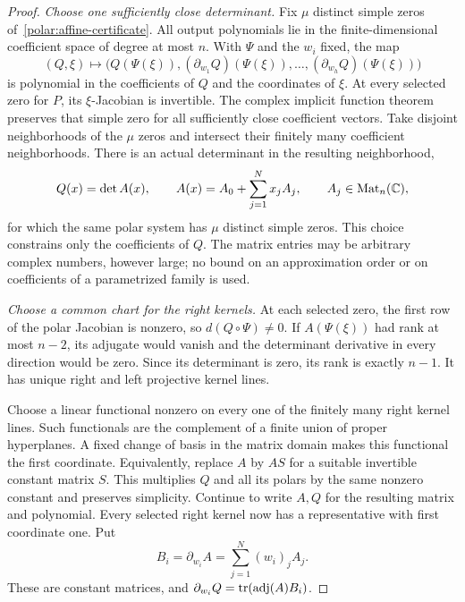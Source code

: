 \begin{proof}
\emph{Choose one sufficiently close determinant.}
Fix $\mu$ distinct simple zeros of~\eqref{polar:affine-certificate}.
All output polynomials lie in the finite-dimensional coefficient space
of degree at most $n$. With $\Psi$ and the $w_i$ fixed, the map
\[
 (Q,\xi)\longmapsto
   \bigl(Q(\Psi(\xi)),(\partial_{w_1}Q)(\Psi(\xi)),\ldots,
                         (\partial_{w_h}Q)(\Psi(\xi))\bigr)
\]
is polynomial in the coefficients of $Q$ and the coordinates of $\xi$.
At every selected zero for $P$, its $\xi$-Jacobian is invertible.
The complex implicit function theorem preserves that simple zero for all
sufficiently close coefficient vectors. Take disjoint neighborhoods of
the $\mu$ zeros and intersect their finitely many coefficient neighborhoods.
There is an actual determinant in the resulting neighborhood,
\begin{equation}\label{polar:chosen-matrix}
 Q(x)=\det A(x),\qquad
 A(x)=A_0+\sum_{j=1}^N x_jA_j,\qquad A_j\in\operatorname{Mat}_n(\mathbb C),
\end{equation}
for which the same polar system has $\mu$ distinct simple zeros.
This choice constrains only the coefficients of $Q$. The matrix entries
may be arbitrary complex numbers, however large; no bound on an
approximation order or on coefficients of a parametrized family is used.

\emph{Choose a common chart for the right kernels.}
At each selected zero, the first row of the polar Jacobian is nonzero,
so $d(Q\circ\Psi)\ne0$. If $A(\Psi(\xi))$ had rank at most $n-2$,
its adjugate would vanish and the determinant derivative in every direction
would be zero. Since its determinant is zero, its rank is exactly $n-1$.
It has unique right and left projective kernel lines.

Choose a linear functional nonzero on every one of the finitely many
right kernel lines. Such functionals are the complement of a finite union
of proper hyperplanes. A fixed change of basis in the matrix domain makes
this functional the first coordinate. Equivalently, replace $A$ by $AS$
for a suitable invertible constant matrix $S$. This multiplies $Q$ and
all its polars by the same nonzero constant and preserves simplicity.
Continue to write $A,Q$ for the resulting matrix and polynomial. Every
selected right kernel now has a representative with first coordinate one.
Put
\[
 B_i=\partial_{w_i}A=\sum_{j=1}^N(w_i)_j A_j.
\]
These are constant matrices, and
$\partial_{w_i}Q=\operatorname{tr}(\operatorname{adj}(A)B_i)$.


\end{proof}
